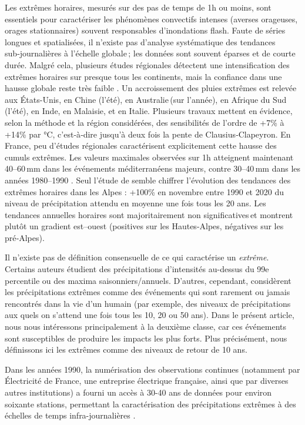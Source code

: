 \documentclass[
  article,
  nofooter,
  noheadings]{jss}
\begin{document}
Les extrêmes horaires, mesurés sur des pas de temps de 1h ou moins, sont
essentiels pour caractériser les phénomènes convectifs intenses (averses
orageuses, orages stationnaires) souvent responsables d'inondations
flash. Faute de séries longues et spatialisées, il n'existe pas
d'analyse systématique des tendances sub‑journalières à l'échelle
globale\,; les données sont souvent éparses et de courte durée. Malgré
cela, plusieurs études régionales détectent une intensification des
extrêmes horaires sur presque tous les continents, mais la confiance
dans une hausse globale reste très faible \citep{IPCC2021}. Un
accroissement des pluies extrêmes est relevée aux États-Unis, en Chine
(l'été), en Australie\,(sur l'année), en Afrique du Sud (l'été), en
Inde, en Malaisie, et en Italie. Plusieurs travaux mettent en évidence,
selon la méthode et la région considérées, des sensibilités de l'ordre
de +7\% à +14\% par °C, c'est‑à‑dire jusqu'à deux fois la pente de
Clausius‑Clapeyron. En France, peu d'études régionales caractérisent
explicitement cette hausse des cumuls extrêmes. Les valeurs maximales
observées sur 1h atteignent maintenant 40--60\,mm dans les événements
méditerranéens majeurs, contre 30--40\,mm dans les années 1980--1990
\citep{meteofrance2024_episodesMediterraneens}. Seul l'étude de
\citet{Berghald2025} semble chiffrer l'évolution des tendances des
extrêmes horaires dans les Alpes : +100\% en novembre entre 1990 et 2020
du niveau de précipitation attendu en moyenne une fois tous les 20 ans.
Les tendances annuelles horaires sont majoritairement non
significatives\,et montrent plutôt un gradient est--ouest (positives sur
les Hautes-Alpes, négatives sur les pré‑Alpes).

Il n'existe pas de définition consensuelle de ce qui caractérise un
\emph{extrême}. Certains auteurs étudient des précipitations
d'intensités au-dessus du 99e percentile ou des maxima
saisonniers/annuels. D'autres, cependant, considèrent les précipitations
extrêmes comme des événements qui sont rarement ou jamais rencontrés
dans la vie d'un humain (par exemple, des niveaux de précipitations aux
quels on s'attend une fois tous les 10, 20 ou 50 ans). Dans le présent
article, nous nous intéressons principalement à la deuxième classe, car
ces événements sont susceptibles de produire les impacts les plus forts.
Plus précisément, nous définissons ici les extrêmes comme des niveaux de
retour de 10 ans.

Dans les années 1990, la numérisation des observations continues
(notamment par Électricité de France, une entreprise électrique
française, ainsi que par diverses autres institutions) a fourni un accès
à 30-40 ans de données pour environ soixante stations, permettant la
caractérisation des précipitations extrêmes à des échelles de temps
infra-journalières \citep{Garcon1993}.
\end{document}
